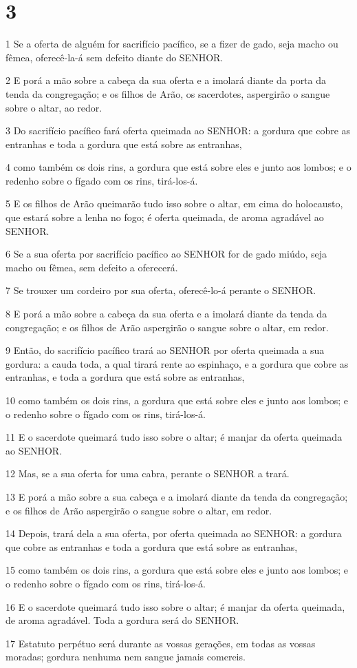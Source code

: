 \chapter{3}

\par 1 Se a oferta de alguém for sacrifício pacífico, se a fizer de gado, seja macho ou fêmea, oferecê-la-á sem defeito diante do SENHOR.
\par 2 E porá a mão sobre a cabeça da sua oferta e a imolará diante da porta da tenda da congregação; e os filhos de Arão, os sacerdotes, aspergirão o sangue sobre o altar, ao redor.
\par 3 Do sacrifício pacífico fará oferta queimada ao SENHOR: a gordura que cobre as entranhas e toda a gordura que está sobre as entranhas,
\par 4 como também os dois rins, a gordura que está sobre eles e junto aos lombos; e o redenho sobre o fígado com os rins, tirá-los-á.
\par 5 E os filhos de Arão queimarão tudo isso sobre o altar, em cima do holocausto, que estará sobre a lenha no fogo; é oferta queimada, de aroma agradável ao SENHOR.
\par 6 Se a sua oferta por sacrifício pacífico ao SENHOR for de gado miúdo, seja macho ou fêmea, sem defeito a oferecerá.
\par 7 Se trouxer um cordeiro por sua oferta, oferecê-lo-á perante o SENHOR.
\par 8 E porá a mão sobre a cabeça da sua oferta e a imolará diante da tenda da congregação; e os filhos de Arão aspergirão o sangue sobre o altar, em redor.
\par 9 Então, do sacrifício pacífico trará ao SENHOR por oferta queimada a sua gordura: a cauda toda, a qual tirará rente ao espinhaço, e a gordura que cobre as entranhas, e toda a gordura que está sobre as entranhas,
\par 10 como também os dois rins, a gordura que está sobre eles e junto aos lombos; e o redenho sobre o fígado com os rins, tirá-los-á.
\par 11 E o sacerdote queimará tudo isso sobre o altar; é manjar da oferta queimada ao SENHOR.
\par 12 Mas, se a sua oferta for uma cabra, perante o SENHOR a trará.
\par 13 E porá a mão sobre a sua cabeça e a imolará diante da tenda da congregação; e os filhos de Arão aspergirão o sangue sobre o altar, em redor.
\par 14 Depois, trará dela a sua oferta, por oferta queimada ao SENHOR: a gordura que cobre as entranhas e toda a gordura que está sobre as entranhas,
\par 15 como também os dois rins, a gordura que está sobre eles e junto aos lombos; e o redenho sobre o fígado com os rins, tirá-los-á.
\par 16 E o sacerdote queimará tudo isso sobre o altar; é manjar da oferta queimada, de aroma agradável. Toda a gordura será do SENHOR.
\par 17 Estatuto perpétuo será durante as vossas gerações, em todas as vossas moradas; gordura nenhuma nem sangue jamais comereis.

